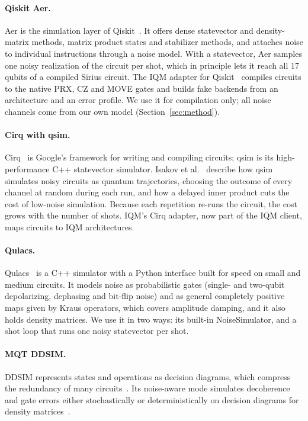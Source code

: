 \documentclass{scspaperproc}
\begin{document}
\paragraph{Qiskit Aer.}
Aer is the simulation layer of Qiskit~\cite{javadi2024}. It offers dense
statevector and density-matrix methods, matrix product states and stabilizer
methods, and attaches noise to individual instructions through a noise model.
With a statevector, Aer samples one noisy realization of the circuit per shot, which in principle lets it reach all 17 qubits of a compiled Sirius
circuit.
The IQM adapter for Qiskit~\cite{iqmclient} compiles circuits to the native
PRX, CZ and MOVE gates and builds fake backends from an architecture and an
error profile. We use it for compilation only; all noise channels come from
our own model (Section~\ref{sec:method}).

\paragraph{Cirq with qsim.}
Cirq~\cite{cirq} is Google's framework for writing and compiling circuits;
qsim is its high-performance C++ statevector simulator. Isakov et
al.~\cite{isakov2021qsim} describe how qsim simulates noisy circuits as quantum
trajectories, choosing the outcome of every channel at random during each run,
and how a delayed inner product cuts the cost of low-noise simulation. Because each repetition re-runs the circuit, the cost grows with the number of
shots.
IQM's Cirq adapter, now part of the IQM client, maps circuits to IQM
architectures.

\paragraph{Qulacs.}
Qulacs~\cite{suzuki2021qulacs} is a C++ simulator with a Python interface built
for speed on small and medium circuits. It models noise as probabilistic gates
(single- and two-qubit depolarizing, dephasing and bit-flip noise) and as
general completely positive maps given by Kraus operators, which covers
amplitude damping, and it also holds density matrices. We use it in two ways:
its built-in NoiseSimulator, and a shot loop that runs one noisy statevector
per shot.

\paragraph{MQT DDSIM.}
DDSIM represents states and operations as decision diagrams, which compress
the redundancy of many circuits~\cite{zulehner2019ddsim}. Its noise-aware mode
simulates decoherence and gate errors either stochastically or
deterministically on decision diagrams for density matrices~\cite{grurl2020noise}.
\end{document}
